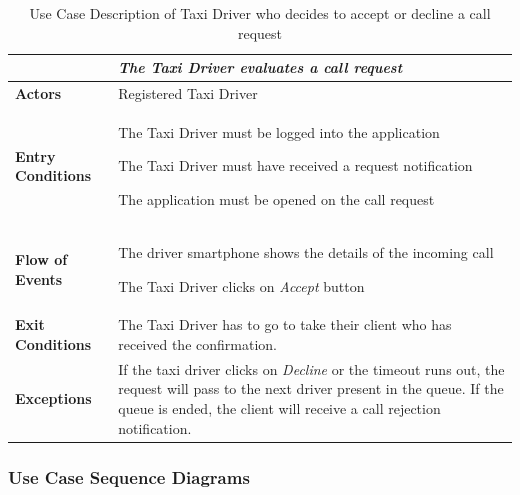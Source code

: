 \documentclass[a4paper]{article}
\begin{document}
\begin{enumerate}[label=\bfseries G\arabic*:]
\begin{table} [H]
\begin{center}
\begin{tabular}{ |m{}|m{}|  }
\hline
    \multicolumn{2}{|c|}{\textbf{\textit{The Taxi Driver evaluates a call request}}} \\
\hline \hline
    \textbf{Actors}
&   Registered Taxi Driver
\\ \hline
    \textbf{Entry Conditions}
&   
    \begin{itemize*}
    \item The Taxi Driver must be logged into the application
    \item The Taxi Driver must have received a request notification
    \item The application must be opened on the call request
    \end{itemize*}
\\ \hline
    \textbf{Flow of Events}
& 
    \begin{enumerate*}
    \item The driver smartphone shows the details of the incoming call
    \item The Taxi Driver clicks on \emph{Accept} button
    \end{enumerate*}
\\ \hline
    \textbf{Exit Conditions}
&  The Taxi Driver has to go to take their client who has received the confirmation.
\\ \hline
    \textbf{Exceptions}
&   If the taxi driver clicks on \emph{Decline} or the timeout runs out, the request will pass to the next driver present in the queue. \newline
If the queue is ended, the client will receive a call rejection notification.
\\ \hline
\end{tabular}
\end{center}
\caption{Use Case Description of Taxi Driver who decides to accept or decline a call request}
\label{table:taxievaluaterequest}
\end{table}

\subsubsection{Use Case Sequence Diagrams}

\newlength{\sequenceWidth}
\setlength{\sequenceWidth}{\textwidth}


\end{enumerate}
\end{document}
